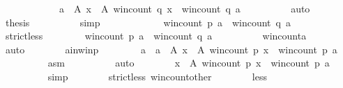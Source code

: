 \begin{isabellebody}
\ \ \ \ \ \ \ \ \ \ \ \ {\isacharbraceleft}{\kern0pt}a\ {\isasymin}\ A{\isachardot}{\kern0pt}\ {\isasymforall}x\ {\isasymin}\ A{\isachardot}{\kern0pt}\ win{\isacharunderscore}{\kern0pt}count\ q\ x\ {\isasymle}\ win{\isacharunderscore}{\kern0pt}count\ q\ a{\isacharbraceright}{\kern0pt}{\isachardoublequoteclose}\isanewline
\ \ \ \ \ \ \ \ \isamarkupfalse%
\ auto\isanewline
\ \ \ \ \ \ \isamarkupfalse%
\ {\isacharquery}{\kern0pt}thesis\isanewline
\ \ \ \ \ \ \ \ \isamarkupfalse%
\ simp\isanewline
\ \ \ \ \isamarkupfalse%
\isanewline
\ \ \ \ \ \ \isamarkupfalse%
\ {\isachardoublequoteopen}win{\isacharunderscore}{\kern0pt}count\ p\ a\ {\isasymnoteq}\ win{\isacharunderscore}{\kern0pt}count\ q\ a{\isachardoublequoteclose}\isanewline
\ \ \ \ \ \ \isamarkupfalse%
\ strict{\isacharunderscore}{\kern0pt}less{\isacharcolon}{\kern0pt}\isanewline
\ \ \ \ \ \ \ \ {\isachardoublequoteopen}win{\isacharunderscore}{\kern0pt}count\ p\ a\ {\isacharless}{\kern0pt}\ win{\isacharunderscore}{\kern0pt}count\ q\ a{\isachardoublequoteclose}\isanewline
\ \ \ \ \ \ \ \ \isamarkupfalse%
\ win{\isacharunderscore}{\kern0pt}count{\isacharunderscore}{\kern0pt}a\isanewline
\ \ \ \ \ \ \ \ \isamarkupfalse%
\ auto\isanewline
\ \ \ \ \ \ \isamarkupfalse%
\ a{\isacharunderscore}{\kern0pt}in{\isacharunderscore}{\kern0pt}win{\isacharunderscore}{\kern0pt}p{\isacharcolon}{\kern0pt}\isanewline
\ \ \ \ \ \ \ \ {\isachardoublequoteopen}a\ {\isasymin}\ {\isacharbraceleft}{\kern0pt}a\ {\isasymin}\ A{\isachardot}{\kern0pt}\ {\isasymforall}x\ {\isasymin}\ A{\isachardot}{\kern0pt}\ win{\isacharunderscore}{\kern0pt}count\ p\ x\ {\isasymle}\ win{\isacharunderscore}{\kern0pt}count\ p\ a{\isacharbraceright}{\kern0pt}{\isachardoublequoteclose}\isanewline
\ \ \ \ \ \ \ \ \isamarkupfalse%
\ asm{}\isanewline
\ \ \ \ \ \ \ \ \isamarkupfalse%
\ auto\isanewline
\ \ \ \ \ \ \isamarkupfalse%
\ {\isachardoublequoteopen}{\isasymforall}x\ {\isasymin}\ A{\isachardot}{\kern0pt}\ win{\isacharunderscore}{\kern0pt}count\ p\ x\ {\isasymle}\ win{\isacharunderscore}{\kern0pt}count\ p\ a{\isachardoublequoteclose}\isanewline
\ \ \ \ \ \ \ \ \isamarkupfalse%
\ simp\isanewline
\ \ \ \ \ \ \isamarkupfalse%
\ strict{\isacharunderscore}{\kern0pt}less\ win{\isacharunderscore}{\kern0pt}count{\isacharunderscore}{\kern0pt}other\isanewline
\ \ \ \ \ \ \isamarkupfalse%
\ less{\isacharcolon}{\kern0pt}\isanewline

\end{isabellebody}
